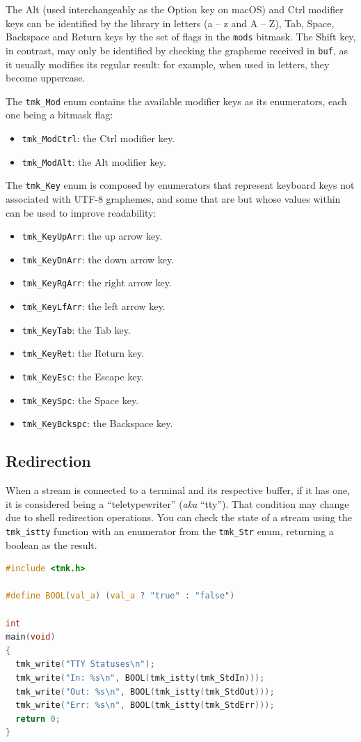 \documentclass{report}
\begin{document}
The Alt (used interchangeably as the Option key on macOS) and Ctrl modifier keys can be identified by the library in letters (a – z and A – Z), Tab, Space, Backspace and Return keys by the set of flags in the \texttt{mods} bitmask. The Shift key, in contrast, may only be identified by checking the grapheme received in \texttt{buf}, as it usually modifies its regular result: for example, when used in letters, they become uppercase.

The \texttt{tmk\_Mod} enum contains the available modifier keys as its enumerators, each one being a bitmask flag:
\begin{itemize}
  \item \texttt{tmk\_ModCtrl}: the Ctrl modifier key.
  \item \texttt{tmk\_ModAlt}: the Alt modifier key.
\end{itemize}

The \texttt{tmk\_Key} enum is composed by enumerators that represent keyboard keys not associated with UTF-8 graphemes, and some that are but whose values within can be used to improve readability:
\begin{itemize}
  \item \texttt{tmk\_KeyUpArr}: the up arrow key.
  \item \texttt{tmk\_KeyDnArr}: the down arrow key.
  \item \texttt{tmk\_KeyRgArr}: the right arrow key.
  \item \texttt{tmk\_KeyLfArr}: the left arrow key.
  \item \texttt{tmk\_KeyTab}: the Tab key.
  \item \texttt{tmk\_KeyRet}: the Return key.
  \item \texttt{tmk\_KeyEsc}: the Escape key.
  \item \texttt{tmk\_KeySpc}: the Space key.
  \item \texttt{tmk\_KeyBckspc}: the Backspace key.
\end{itemize}
\subsection{Redirection}
When a stream is connected to a terminal and its respective buffer, if it has one, it is considered being a ``teletypewriter'' (\textit{aka} ``tty''). That condition may change due to shell redirection operations. You can check the state of a stream using the \texttt{tmk\_istty} function with an enumerator from the \texttt{tmk\_Str} enum, returning a boolean as the result.
\begin{lstlisting}[language=c,caption=an example that checks if each stream is a tty.]
#include <tmk.h>

#define BOOL(val_a) (val_a ? "true" : "false")

int
main(void)
{
  tmk_write("TTY Statuses\n");
  tmk_write("In: %s\n", BOOL(tmk_istty(tmk_StdIn)));
  tmk_write("Out: %s\n", BOOL(tmk_istty(tmk_StdOut)));
  tmk_write("Err: %s\n", BOOL(tmk_istty(tmk_StdErr)));
  return 0;
}
\end{lstlisting}
\end{document}
